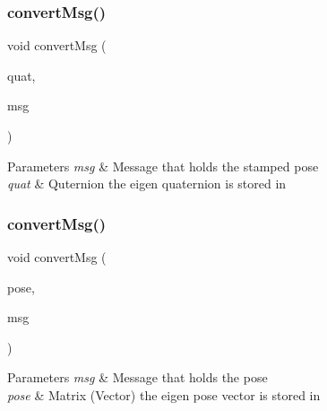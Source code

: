 \subsubsection{\texorpdfstring{convert\+Msg()}{convertMsg()}\hspace{0.1cm}{\footnotesize\ttfamily [5/14]}}
{\footnotesize\ttfamily void convert\+Msg (\begin{DoxyParamCaption}\item[{Eigen\+::\+Quaterniond \&}]{quat,  }\item[{geometry\+\_\+msgs\+::\+Pose\+Stamped \&}]{msg }\end{DoxyParamCaption})\hspace{0.3cm}{\ttfamily [inline]}}


\begin{DoxyParams}{Parameters}
{\em msg} & Message that holds the stamped pose \\
\hline
{\em quat} & Quternion the eigen quaternion is stored in \\
\hline
\end{DoxyParams}
\mbox{\label{group__MultiRobotController_gafde5764b46f0189c2aea14ed57434708}} 
\subsubsection{\texorpdfstring{convert\+Msg()}{convertMsg()}\hspace{0.1cm}{\footnotesize\ttfamily [6/14]}}
{\footnotesize\ttfamily void convert\+Msg (\begin{DoxyParamCaption}\item[{Eigen\+::\+Matrix$<$ double, 7, 1 $>$ \&}]{pose,  }\item[{geometry\+\_\+msgs\+::\+Pose \&}]{msg }\end{DoxyParamCaption})\hspace{0.3cm}{\ttfamily [inline]}}


\begin{DoxyParams}{Parameters}
{\em msg} & Message that holds the pose \\
\hline
{\em pose} & Matrix (Vector) the eigen pose vector is stored in \\
\hline
\end{DoxyParams}
\mbox{\label{group__MultiRobotController_ga9e842115a5f448ab0e3ba9fea93d5179}} 
